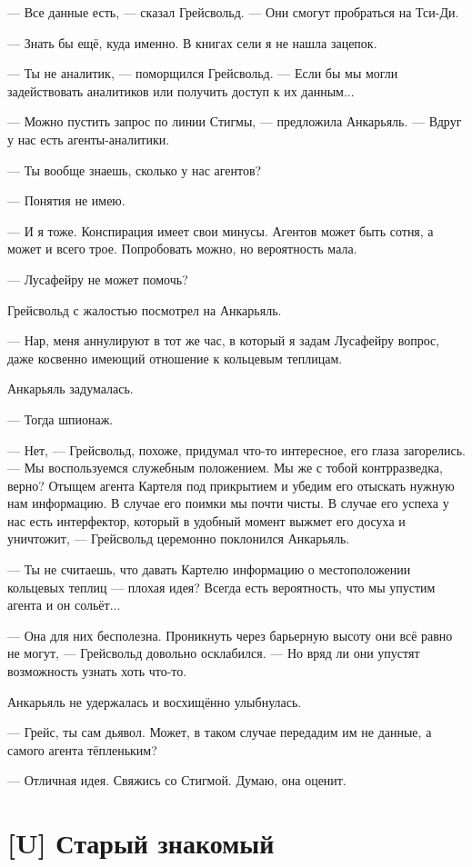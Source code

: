 \textspace

--- Все данные есть, --- сказал Грейсвольд.
--- Они смогут пробраться на Тси-Ди.

--- Знать бы ещё, куда именно.
В книгах сели я не нашла зацепок.

--- Ты не аналитик, --- поморщился Грейсвольд.
--- Если бы мы могли задействовать аналитиков или получить доступ к их данным...

--- Можно пустить запрос по линии Стигмы, --- предложила Анкарьяль.
--- Вдруг у нас есть агенты-аналитики.

--- Ты вообще знаешь, сколько у нас агентов?

--- Понятия не имею.

--- И я тоже.
Конспирация имеет свои минусы.
Агентов может быть сотня, а может и всего трое.
Попробовать можно, но вероятность мала.

--- Лусафейру не может помочь?

Грейсвольд с жалостью посмотрел на Анкарьяль.

--- Нар, меня аннулируют в тот же час, в который я задам Лусафейру вопрос, даже косвенно имеющий отношение к кольцевым теплицам.

Анкарьяль задумалась.

--- Тогда шпионаж.

--- Нет, --- Грейсвольд, похоже, придумал что-то интересное, его глаза загорелись.
--- Мы воспользуемся служебным положением.
Мы же с тобой контрразведка, верно?
Отыщем агента Картеля под прикрытием и убедим его отыскать нужную нам информацию.
В случае его поимки мы почти чисты.
В случае его успеха у нас есть интерфектор, который в удобный момент выжмет его досуха и уничтожит, --- Грейсвольд церемонно поклонился Анкарьяль.

--- Ты не считаешь, что давать Картелю информацию о местоположении кольцевых теплиц --- плохая идея?
Всегда есть вероятность, что мы упустим агента и он сольёт...

--- Она для них бесполезна.
Проникнуть через барьерную высоту они всё равно не могут, --- Грейсвольд довольно осклабился.
--- Но вряд ли они упустят возможность узнать хоть что-то.

Анкарьяль не удержалась и восхищённо улыбнулась.

--- Грейс, ты сам дьявол.
Может, в таком случае передадим им не данные, а самого агента тёпленьким?

--- Отличная идея.
Свяжись со Стигмой.
Думаю, она оценит.

\section{[U] Старый знакомый}

